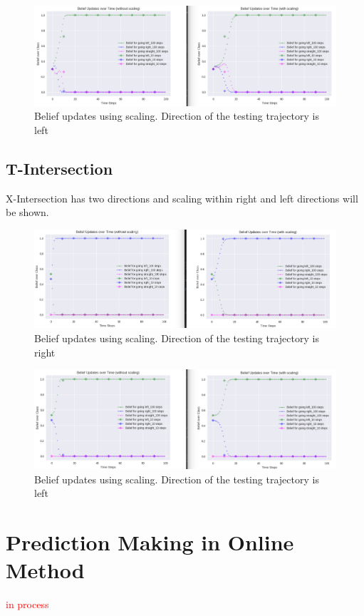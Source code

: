 \begin{figure}[h]
	\centering  	
	\includegraphics[width=15cm]{img/Scaling_Left_X.jpg}
	\caption{Belief updates using scaling. Direction of the testing trajectory is left}
	\label{fig:ScallingLeftX}    
\end{figure}


\subsection{T-Intersection}

X-Intersection has two directions and scaling within right and left directions will be shown.

\begin{figure}[h]
	\centering  	
	\includegraphics[width=15cm]{img/Scaling_Right_T.jpg}
	\caption{Belief updates using scaling. Direction of the testing trajectory is right}
	\label{fig:ScallingRightT}    
\end{figure}

\begin{figure}[h]
	\centering  	
	\includegraphics[width=15cm]{img/Scaling_Left_T.jpg}
	\caption{Belief updates using scaling. Direction of the testing trajectory is left}
	\label{fig:ScallingLeftT}    
\end{figure}

\section{Prediction Making in Online Method}

\textcolor{red}{in process}